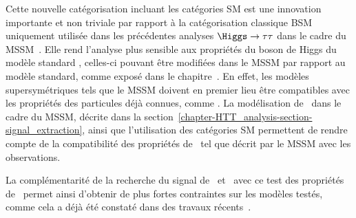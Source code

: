 \par
Cette nouvelle catégorisation incluant les catégories SM est une innovation importante et non triviale par rapport à la catégorisation classique \og BSM uniquement \fg{} utilisée dans les précédentes analyses $\Higgs\to\tau\tau$ dans le cadre du MSSM~\cite{CMS-PAS-HIG-13-021,CMS-PAS-HIG-14-029,CMS-PAS-HIG-17-020}.
Elle rend l'analyse plus sensible aux propriétés du boson de Higgs du modèle standard \higgs, celles-ci pouvant être modifiées dans le MSSM par rapport au modèle standard, comme exposé dans le chapitre~.
En effet, les modèles supersymétriques tels que le MSSM doivent en premier lieu être compatibles avec les propriétés des particules déjà connues, comme \higgs.
La modélisation de \higgs\ dans le cadre du MSSM, décrite dans la section~\ref{chapter-HTT_analysis-section-signal_extraction}, ainsi que l'utilisation des catégories SM permettent de rendre compte de la compatibilité des propriétés de \higgs\ tel que décrit par le MSSM avec les observations.
\par
La complémentarité de la recherche du signal de \Higgs\ et \HiggsA\ avec ce test des propriétés de \higgs\ permet ainsi d'obtenir de plus fortes contraintes sur les modèles testés, comme cela a déjà été constaté dans des travaux récents~\cite{Artur_thesis}.

%
%
%
%



